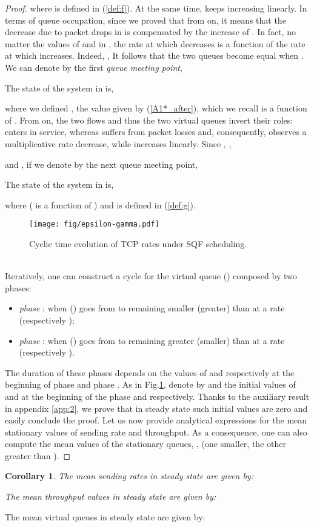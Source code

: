 \documentclass[a4paper,oneside, 11pt]{article}
\newtheorem{cor}[theorem]{Corollary}
\begin{document}
\begin{proof}
where  is defined in (\ref{def:f}).
At the same time,  keeps increasing linearly.
In terms of queue occupation, since we proved that  from  on, it means that the decrease
due to packet drops in   is compensated by
the increase of .
In fact, no matter the values of  and  in , the rate at which  decreases is a function of the rate at which  increases.
Indeed, ,
It follows that the two queues become equal when .
We can denote by  the first \textit{queue meeting point},

The state of the system in  is,

where we defined , the value  given by (\ref{A1*_after}), which we recall is a function of .
From  on, the two flows and thus the two virtual queues invert their roles:  enters in service, whereas  suffers from packet losses and, consequently,  observes a multiplicative rate decrease, while  increases linearly.
Since , ,

and , if we denote by  the next queue meeting point,

The state of the system in  is,

where  ( is a function of ) and
 is defined in (\ref{def:g}).
\begin{figure}[htb]
\begin{center}
\texttt{[image: fig/epsilon-gamma.pdf]}
\end{center}
\caption{Cyclic time evolution of TCP rates under SQF scheduling.}
 \label{fig:rates-cycle}
\end{figure}
\\Iteratively, one can construct a cycle for the virtual queue  ()  composed by two phases:
\begin{itemize}
 \item \textit{phase  }: when  () goes from  to  remaining smaller (greater) than  at a rate  (respectively );
 \item \textit{phase }:  when  () goes from  to  remaining greater (smaller) than  at a rate  (respectively ).
\end{itemize}
The duration of these phases depends on the values of  and  respectively at the beginning of phase  and phase .
As in Fig.\ref{fig:rates-cycle}, denote by  and  the initial values of  and  at the beginning of the  phase  and  respectively.
Thanks to the auxiliary result  in appendix \ref{app:2}, we prove that in steady state such initial values are zero and easily conclude the proof.
Let us now provide analytical expressions for the mean stationary values of sending rate and throughput. As a consequence, one can also compute the mean values of the stationary queues,
,  (one smaller, the other greater than ).
\end{proof}
\begin{cor}\label{cor:SQF}
The \textit{mean sending rates} in steady state are given by:


The \textit{mean throughput values} in steady state are given by:

\end{cor}
The mean virtual queues in steady state are given by:
\end{document}
